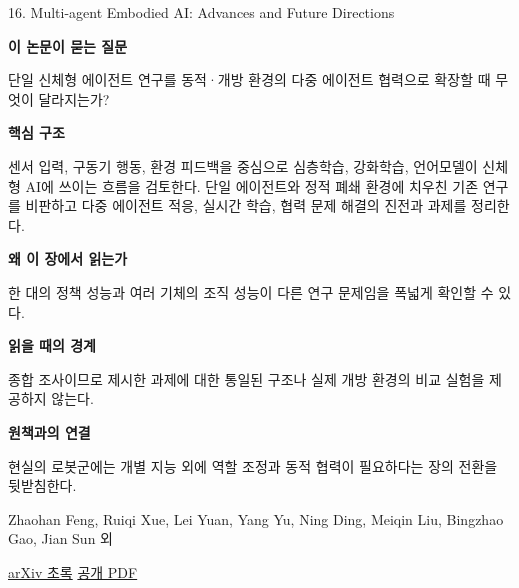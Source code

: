 \documentclass[11pt,openany]{book}
\begin{document}
\begin{termcard}{16. Multi-agent Embodied AI: Advances and Future Directions}

\par

\medskip

{\sffamily\bfseries\color{deepblue} 이 논문이 묻는 질문}\par

단일 신체형 에이전트 연구를 동적·개방 환경의 다중 에이전트 협력으로 확장할 때 무엇이 달라지는가?

\smallskip

{\sffamily\bfseries\color{deepblue} 핵심 구조}\par

센서 입력, 구동기 행동, 환경 피드백을 중심으로 심층학습, 강화학습, 언어모델이 신체형 AI에 쓰이는 흐름을 검토한다. 단일 에이전트와 정적 폐쇄 환경에 치우친 기존 연구를 비판하고 다중 에이전트 적응, 실시간 학습, 협력 문제 해결의 진전과 과제를 정리한다.

\smallskip

{\sffamily\bfseries\color{deepblue} 왜 이 장에서 읽는가}\par

한 대의 정책 성능과 여러 기체의 조직 성능이 다른 연구 문제임을 폭넓게 확인할 수 있다.

\smallskip

{\sffamily\bfseries\color{coral} 읽을 때의 경계}\par

종합 조사이므로 제시한 과제에 대한 통일된 구조나 실제 개방 환경의 비교 실험을 제공하지 않는다.

\smallskip

{\sffamily\bfseries\color{teal} 원책과의 연결}\par

현실의 로봇군에는 개별 지능 외에 역할 조정과 동적 협력이 필요하다는 장의 전환을 뒷받침한다.

\medskip

{\footnotesize\color{muted} Zhaohan Feng, Ruiqi Xue, Lei Yuan, Yang Yu, Ning Ding, Meiqin Liu, Bingzhao Gao, Jian Sun 외\par

\href{https://arxiv.org/abs/2505.05108}{arXiv 초록} \quad \href{https://arxiv.org/pdf/2505.05108}{공개 PDF}\par}

\end{termcard}
\end{document}

